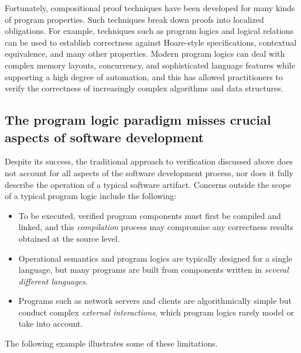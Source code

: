 \documentclass[acmsmall,screen,review,nonacm]{acmart}
\begin{document}
Fortunately,
compositional proof techniques have been developed
for many kinds of program properties.
Such techniques break down proofs into
localized obligations.
For example,
techniques such as
program logics and logical relations
can be used to establish
correctness against Hoare-style specifications,
contextual equivalence,
and many other properties.
%
Modern program logics can deal with
complex memory layouts,
concurrency,
and sophisticated language features
while supporting
a high degree of automation,
and this has allowed practitioners
to verify the correctness of 
increasingly complex algorithms and data structures.



\subsection{The program logic paradigm %
  misses crucial aspects of software development}

Despite its success,
the traditional approach to verification
discussed above
does not account for all aspects of the software development process,
nor does it fully describe
the operation of a typical software artifact.
Concerns outside the scope of a typical program logic include the following:
\begin{itemize}
  \item To be executed,
    verified program components must first be compiled and linked,
    and this \emph{compilation} process may compromise
    any correctness results obtained at the source level.
  \item Operational semantics and program logics
    are typically designed for a single language, but
    many programs are built from components written
    in \emph{several different languages}.
  \item Programs such as network servers and clients
    are algorithmically simple
    but conduct complex \emph{external interactions},
    which program logics rarely model or take into account.
\end{itemize}
The following example illustrates some of these limitations.
\end{document}
